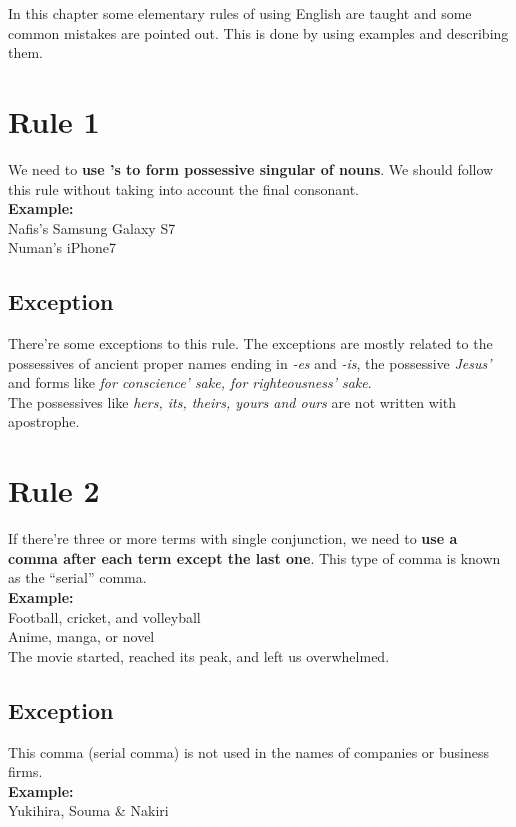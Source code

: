 \documentclass[12pt]{report}
\begin{document}
\raggedright
In this chapter some elementary rules of using English are taught and some common mistakes are pointed out. This is done by using examples and describing them.

\section{Rule 1}
We need to \textbf{use 's to form possessive singular of nouns}. We should follow this rule without taking into account the final consonant.\\
\textbf{Example:}\\
Nafis's Samsung Galaxy S7\\
Numan's iPhone7\\

\subsection{Exception}
There're some exceptions to this rule. The exceptions are mostly related to the possessives of ancient proper names ending in \textit{-es} and \textit{-is}, the possessive \textit{Jesus'} and forms like \textit{for conscience' sake, for righteousness' sake}.\\
The possessives like \textit{hers, its, theirs, yours \emph{and} ours} are not written with apostrophe.


\section{Rule 2}
If there're three or more terms with single conjunction, we need to \textbf{use a comma after each term except the last one}. This type of comma is known as the ``serial'' comma.\\
\newpage
\textbf{Example:}\\
Football, cricket, and volleyball\\
Anime, manga, or novel\\
The movie started, reached its peak, and left us overwhelmed.\\

\subsection{Exception}
This comma (serial comma) is not used in the names of companies or business firms.\\ \textbf{Example:}\\ 
Yukihira, Souma \& Nakiri
\end{document}
